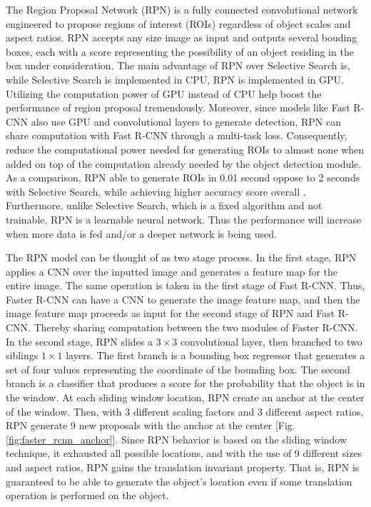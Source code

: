 The Region Proposal Network (RPN) is a fully connected convolutional network engineered to propose regions of interest (ROIs) regardless of object scales and aspect ratios. RPN accepts any size image as input and outputs several bouding boxes, each with a score representing the possibility of an object residing in the box under consideration. The main advantage of RPN over Selective Search is, while Selective Search is implemented in CPU, RPN is implemented in GPU. Utilizing the computation power of GPU instead of CPU help boost the performance of region proposal tremendously. Moreover, since models like Fast R-CNN also use GPU and convolutional layers to generate detection, RPN can share computation with Fast R-CNN through a multi-task loss. Consequently, reduce the computational power needed for generating ROIs to almost none when added on top of the computation already needed by the object detection module. As a comparison, RPN able to generate ROIs in 0.01 second oppose to 2 seconds with Selective Search, while achieving higher accuracy score overall \cite{faster_rcnn_2015}. Furthermore, unlike Selective Search, which is a fixed algorithm and not trainable, RPN is a learnable neural network. Thus the performance will increase when more data is fed and/or a deeper network is being used. 

The RPN model can be thought of as two stage process. In the first stage, RPN applies a CNN over the inputted image and generates a feature map for the entire image. The same operation is taken in the first stage of Fast R-CNN. Thus, Faster R-CNN can have a CNN to generate the image feature map, and then the image feature map proceeds as input for the second stage of RPN and Fast R-CNN. Thereby sharing computation between the two modules of Faster R-CNN. In the second stage, RPN slides a $3 \times 3$ convolutional layer, then branched to two siblings $1 \times 1$ layers. The first branch is a bounding box regressor that generates a set of four values representing the coordinate of the bounding box. The second branch is a classifier that produces a score for the probability that the object is in the window. At each sliding window location, RPN create an anchor at the center of the window. Then, with 3 different scaling factors and 3 different aspect ratios, RPN generate 9 new proposals with the anchor at the center [Fig. \ref{fig:faster_rcnn_anchor}]. Since RPN behavior is based on the sliding window technique, it exhausted all possible locations, and with the use of 9 different sizes and aspect ratios, RPN gains the translation invariant property. That is, RPN is guaranteed to be able to generate the object's location even if some translation operation is performed on the object.

